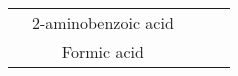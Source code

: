 \begin{landscape}
\begin{table}[]
\begin{tabular}{c|c|c|c|c}
                                                                                                 & 2-aminobenzoic acid                                                                                   &                                                                                                      &                                                                                              &                                                                                                                                                                                                                                                                                                                                                                                                                                                                                                                                                                                                                                                                                                                                                                                                                                                                                                                           \\
                                                                                                 & Formic acid                                                                                           &                                                                                                      &                                                                                              &                                                                                                                                                                                                                                                                                                                                                                                                                                                                                                                                                                                                                                                                                                                                                                                                                                                                                                                           \\

\end{tabular}
\end{table}
\end{landscape}
